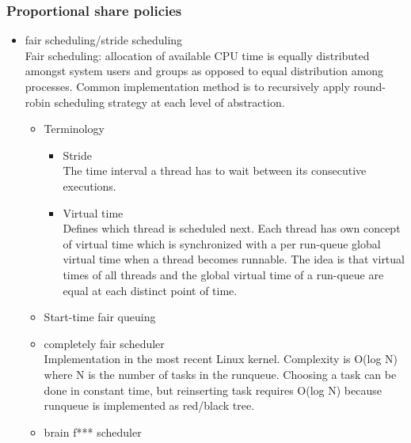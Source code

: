 \documentclass[11pt]{article}
\begin{document}
\subsubsection{Proportional share policies}
\label{sec-1_2_3}
\begin{itemize}

\item fair scheduling/stride scheduling\\
\label{sec-1_2_3_1}%
Fair scheduling: allocation of available CPU time is equally distributed
amongst system users and groups as opposed to equal distribution among
processes.  Common implementation method is to recursively apply
round-robin scheduling strategy at each level of abstraction.
\begin{itemize}

\item Terminology
\label{sec-1_2_3_1_1}%
\begin{itemize}

\item Stride\\
\label{sec-1_2_3_1_1_1}%
The time interval a thread has to wait between its consecutive
executions.

\item Virtual time\\
\label{sec-1_2_3_1_1_2}%
Defines which thread is scheduled next.  Each thread has own concept of
virtual time which is synchronized with a per run-queue global virtual
time when a thread becomes runnable.  The idea is that virtual times of
all threads and the global virtual time of a run-queue are equal at each
distinct point of time.
\end{itemize} %

\item Start-time fair queuing\\
\label{sec-1_2_3_1_2}%
\item completely fair scheduler\\
\label{sec-1_2_3_1_3}%
Implementation in the most recent Linux kernel. Complexity is O(log N)
where N is the number of tasks in the runqueue.  Choosing a task can be
done in constant time, but reinserting task requires O(log N) because
runqueue is implemented as red/black tree.

\item brain f*** scheduler
\label{sec-1_2_3_1_4}%
\begin{itemize}


\end{itemize}
\end{itemize}
\end{itemize}
\end{document}
